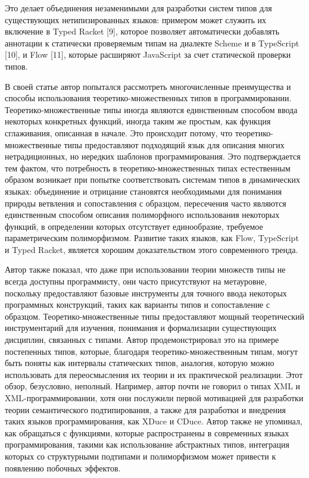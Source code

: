 Это делает объединения незаменимыми для разработки систем типов для существующих нетипизированных
языков: примером может служить их включение в Typed Racket [9], которое позволяет
автоматически добавлять аннотации к статически проверяемым типам на диалекте Scheme и в
TypeScript [10], и Flow [11], которые расширяют JavaScript за счет статической проверки типов.

В своей статье автор попытался рассмотреть многочисленные преимущества и способы использования теоретико-множественных
типов в программировании.
Теоретико-множественные типы иногда являются единственным способом ввода некоторых конкретных функций, иногда таким же
простым, как функция сглаживания, описанная в начале.
Это происходит потому, что теоретико-множественные типы предоставляют подходящий язык для описания многих нетрадиционных,
но нередких шаблонов программирования.
Это подтверждается тем фактом, что потребность в теоретико-множественных типах естественным образом возникает при
попытке соответствовать системам типов в динамических языках: объединение и отрицание становятся необходимыми для
понимания природы ветвления и сопоставления с образцом, пересечения часто являются единственным способом описания
полиморфного использования некоторых функций, в определении которых отсутствует единообразие, требуемое параметрическим
полиморфизмом.
Развитие таких языков, как Flow, TypeScript и Typed Racket, является хорошим доказательством этого современного тренда.

Автор также показал, что даже при использовании теории множеств типы не всегда доступны программисту, они часто
присутствуют на метауровне, поскольку предоставляют базовые инструменты для точного ввода некоторых программных конструкций,
таких как варианты типов и сопоставление с образцом.
Теоретико-множественные типы предоставляют мощный теоретический инструментарий для изучения, понимания и формализации
существующих дисциплин, связанных с типами.
Автор продемонстрировал это на примере постепенных типов, которые, благодаря теоретико-множественным типам, могут быть
поняты как интервалы статических типов, аналогия, которую можно использовать для переосмысления их теории и их
практической реализации.
Этот обзор, безусловно, неполный.
Например, автор почти не говорил о типах XML и XML-программировании, хотя они послужили первой мотивацией для разработки
теории семантического подтипирования, а также для разработки и внедрения таких языков программирования, как XDuce и CDuce.
Автор также не упоминал, как обращаться с функциями, которые распространены в современных языках программирования,
такими как использование абстрактных типов, интеграция которых со структурными подтипами и полиморфизмом может привести
к появлению побочных эффектов.

